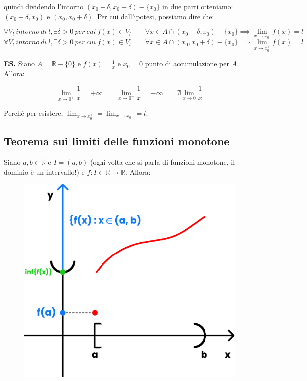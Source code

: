 \documentclass{article}
\begin{document}
\noindent quindi dividendo l'intorno $(x_0 - \delta, x_0 + \delta) - \{x_0\}$ in due parti otteniamo: $(x_0 - \delta, x_0)$ e $(x_0, x_0 + \delta)$. Per cui dall'ipotesi, possiamo dire che:

\begin{equation*}
    \forall V_l \ intorno \ di \ l, \exists \delta > 0 \ per \ cui \ f(x) \in V_l \qquad \forall x \in A \cap (x_0 - \delta, x_0) - \{x_0\} \implies \lim_{x \to x^-_0} f(x) = l
\end{equation*}
\begin{equation*}
    \forall V_l \ intorno \ di \ l, \exists \delta > 0 \ per \ cui \ f(x) \in V_l \qquad \forall x \in A \cap (x_0, x_0 + \delta) - \{x_0\} \implies \lim_{x \to x^+_0} f(x) = l
\end{equation*}

\noindent\textbf{ES.} Siano $A = \mathbb{R} - \{0\}$ e $f(x) = \frac{1}{x}$ e $x_0 = 0$ punto di accumulazione per $A$. Allora:

\begin{equation*}
    \lim_{x \to 0^+} \frac{1}{x} = +\infty \qquad \lim_{x \to 0^-} \frac{1}{x} = -\infty \qquad \nexists\lim_{x \to 0} \frac{1}{x} 
\end{equation*}

\noindent Perché per esistere, $\lim_{x \to x^+_0} = \lim_{x \to x^-_0} = l$.

\subsection{Teorema sui limiti delle funzioni monotone}
Siano $a, b \in \widetilde{\mathbb{R}}$ e $I = (a, b)$ (ogni volta che si parla di funzioni monotone, il dominio è un intervallo!) e $f: I \subset \mathbb{R} \xrightarrow{} \mathbb{R}$. Allora:

\begin{figure}
\includegraphics[width=0.7\linewidth]{images/monotonicFunctionsLimits.pdf} 
\vspace{-20pt}
\end{figure}
\end{document}
